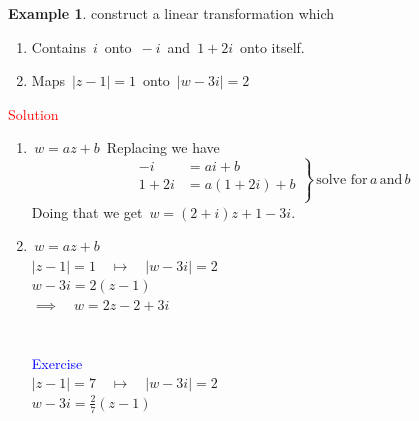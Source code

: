 \documentclass[11pt,a4paper]{article}
\theoremstyle{definition}
\newtheorem{example}[thm]{Example}
\begin{document}
\begin{example}
construct a linear transformation which 
\begin{enumerate}
\item Contains $\, i\,$ onto $\, -i\,$ and $\, 1 + 2i\,$ onto itself.
\item Maps $\, \left|z - 1\right|  = 1\,$ onto $\, \left|w - 3i\right|= 2$\\
\end{enumerate}


\textcolor{red}{Solution}
\begin{enumerate}
\item $\, w =  az + b\,$ Replacing we have 
$$
\left.\begin{aligned}
-i & = a i + b\\
1 + 2i & = a(1 + 2i) + b\\
\end{aligned}
\right\} \,\text{solve for} \, a \,\text{and}\,b
$$
Doing that we get $\, w = (2 + i)z + 1 - 3i$.\\


\item $\, w = az + b$\\

$\left|z - 1\right| = 1\quad \longmapsto\quad  \left|w - 3i\right| = 2$\\

$ w - 3i = 2(z - 1)$\\

$\implies\quad  w = 2z - 2 + 3i$\\\\\\




\textcolor{blue}{Exercise}\\
$\left|z - 1\right| = 7 \quad  \longmapsto \quad \left|w - 3i\right| = 2$\\

$w - 3i = \frac{2}{7} (z - 1)$\\\\
\end{enumerate}
\end{example}
\end{document}
